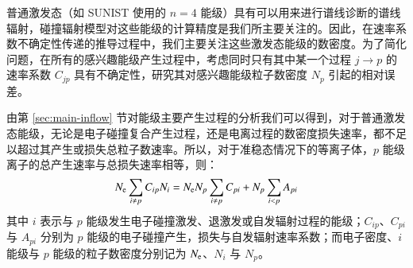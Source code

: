 
普通激发态（如 SUNIST 使用的 $n=4$ 能级）具有可以用来进行谱线诊断的谱线辐射，碰撞辐射模型对这些能级的计算精度是我们所主要关注的。因此，在速率系数不确定性传递的推导过程中，我们主要关注这些激发态能级的数密度。为了简化问题，在所有的感兴趣能级产生过程中，考虑同时只有其中某一个过程 $j\to p$ 的速率系数 $C_{jp}$ 具有不确定性\cite{Andrew2000PPCFSensitivity}，研究其对感兴趣能级粒子数密度 $N_p$ 引起的相对误差。

由第 \ref{sec:main-inflow} 节对能级主要产生过程的分析我们可以得到，对于普通激发态能级，无论是电子碰撞复合产生过程，还是电离过程的数密度损失速率，都不足以超过其产生或损失总粒子数速率。所以，对于准稳态情况下的等离子体，$p$ 能级离子的总产生速率与总损失速率相等，则：
\begin{equation}
N_{\rm e}\sum_{i\ne p}C_{ip}N_i=N_{\rm e}N_p\sum_{i\ne p}C_{pi}+N_p\sum_{i<p}A_{pi}
\label{eq:appendix:error:rateequation}
\end{equation}
其中 $i$ 表示与 $p$ 能级发生电子碰撞激发、退激发或自发辐射过程的能级；$C_{ip}$、$C_{pi}$ 与 $A_{pi}$ 分别为 $p$ 能级的电子碰撞产生，损失与自发辐射速率系数；而电子密度、$i$ 能级与 $p$ 能级的粒子数密度分别记为 $N_{\rm e}$、$N_i$ 与 $N_p$。

